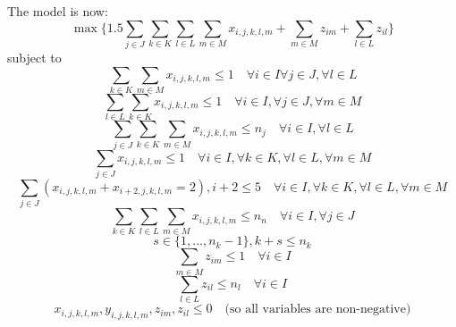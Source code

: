 \documentclass[a4paper, 12pt]{report}
\begin{document}
The model is now:
\begin{equation*}
	\max \{1.5 \sum_{j \in J} \sum_{k \in K} \sum_{l \in L} \sum_{m \in M}
	x_{i,j,k,l,m} + \sum_{m \in M} z_{im} + \sum_{l \in L}z_{il} \}
\end{equation*}
subject to
\begin{equation*}
	\sum_{k \in K} \sum_{m \in M} x_{i,j,k,l,m} \leq 1 \quad \forall i \in I
	\forall j \in J, \forall l \in L
\end{equation*}
\begin{equation*}
	\sum_{l \in L} \sum_{k \in K} x_{i,j,k,l,m} \leq 1 \quad \forall i \in I,
	\forall j \in J, \forall m \in M
\end{equation*}
\begin{equation*}
	\sum_{j \in J} \sum_{k \in K} \sum_{m \in M} x_{i,j,k,l,m} \leq n_j \quad 
	\forall i \in I, \forall l \in L
\end{equation*}
\begin{equation*}
	\sum_{j \in J}x_{i,j,k,l,m} \leq 1 \quad \forall i \in I, \forall k \in K,
	\forall l \in L, \forall m \in M
\end{equation*}
\begin{equation*}
	\sum_{j \in J}(x_{i,j,k,l,m} + x_{i+2,j,k,l,m} = 2), i + 2 \leq 5 \quad
	\forall i \in I, \forall k \in K, \forall l \in L, \forall m \in M
\end{equation*}
\begin{equation*}
	\sum_{k \in K} \sum_{l \in L} \sum_{m \in M} x_{i,j,k,l,m} \leq n_n \quad
	\forall i \in I, \forall j \in J 
\end{equation*}
\begin{equation*}
	s \in \{1, \ldots, n_k - 1\}, k + s \leq n_k
\end{equation*}
\begin{equation*}
	\sum_{m \in M}z_{im} \leq 1 \quad \forall i \in I
\end{equation*}
\begin{equation*}
	\sum_{l \in L} z_{il} \leq n_l \quad \forall i \in I
\end{equation*}
\begin{equation*}
	x_{i,j,k,l,m}, y_{i,j,k,l,m}, z_{im}, z_{il} \leq 0 \quad \text{(so all
	variables are non-negative)}
\end{equation*}
\end{document}
